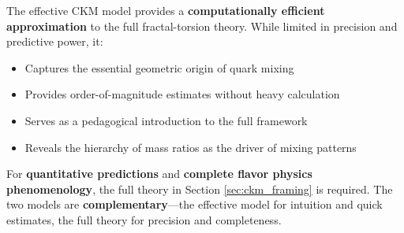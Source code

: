 The effective CKM model provides a \textbf{computationally efficient approximation} to the full fractal-torsion theory. While limited in precision and predictive power, it:

\begin{itemize}
    \item Captures the essential geometric origin of quark mixing
    \item Provides order-of-magnitude estimates without heavy calculation
    \item Serves as a pedagogical introduction to the full framework
    \item Reveals the hierarchy of mass ratios as the driver of mixing patterns
\end{itemize}

For \textbf{quantitative predictions} and \textbf{complete flavor physics phenomenology}, the full theory in Section \ref{sec:ckm_framing} is required. The two models are \textbf{complementary}—the effective model for intuition and quick estimates, the full theory for precision and completeness.
